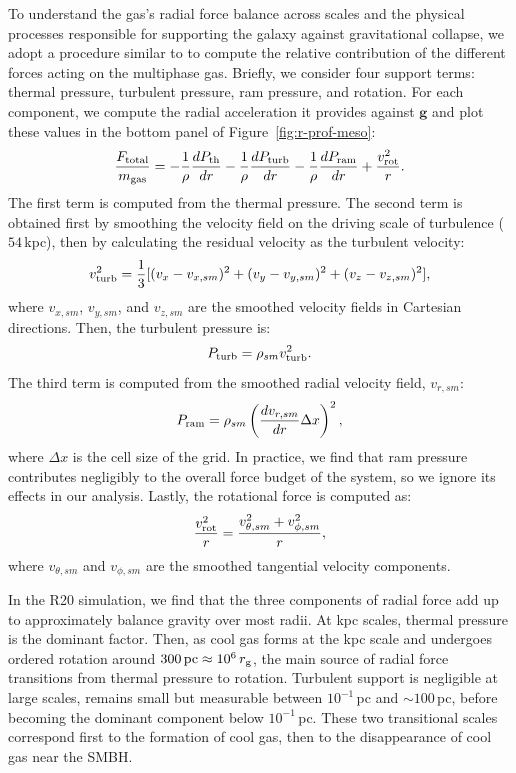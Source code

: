 To understand the gas's radial force balance across scales and the physical processes responsible for supporting the galaxy against gravitational collapse, we adopt a procedure similar to \citet{lochhaas_figuring_2022} to compute the relative contribution of the different forces acting on the multiphase gas.
Briefly, we consider four support terms: thermal pressure, turbulent pressure, ram pressure, and rotation.
For each component, we compute the radial acceleration it provides against $\mathbf{g}$ and plot these values in the bottom panel of Figure~\ref{fig:r-prof-meso}:
\begin{equation}
\frac{F_{\rm total}}{m_{\rm gas}}
=
-\frac{1}{\rho}\frac{dP_{\rm th}}{dr}
-\frac{1}{\rho}\frac{dP_{\rm turb}}{dr}
-\frac{1}{\rho}\frac{dP_{\rm ram}}{dr}
+\frac{v_{\rm rot}^{2}}{r}.
\end{equation}
The first term is computed from the thermal pressure.
The second term is obtained first by smoothing the velocity field on the driving scale of turbulence ($54$\,kpc), then by calculating the residual velocity as the turbulent velocity:
\begin{equation}
    v_{\rm turb}^2 = \frac{1}{3}
[(v_x - v_{x,sm})^2
+
(v_y - v_{y,sm})^2
+
(v_z - v_{z,sm})^2],
\end{equation}
where $v_{x,sm}$, $v_{y,sm}$, and $v_{z,sm}$ are the smoothed velocity fields in Cartesian directions.
Then, the turbulent pressure is:
\begin{equation}
    P_{\rm turb} = \rho_{sm} v_{\rm turb}^2.
\end{equation}
The third term is computed from the smoothed radial velocity field, $v_{r,sm}$:
\begin{equation}
    P_{\rm ram} = \rho_{sm} \left(\frac{dv_{r,sm}}{dr}\Delta x\right)^2,
\end{equation}
where $\Delta x$ is the cell size of the grid.
In practice, we find that ram pressure contributes negligibly to the overall force budget of the system, so we ignore its effects in our analysis.
Lastly, the rotational force is computed as:
\begin{equation}
    \frac{v_{\rm rot}^2}{r} = \frac{v_{\theta,sm}^2 + v_{\phi,sm}^2}{r},
\end{equation}
where $v_{\theta,sm}$ and $v_{\phi,sm}$ are the smoothed tangential velocity components.



In the R20 simulation, we find that the three components of radial force add up to approximately balance gravity over most radii. At kpc scales, thermal pressure is the dominant factor.
Then, as cool gas forms at the kpc scale and undergoes ordered rotation around $300\,\mathrm{pc}\approx 10^6\,r_{\rm g}$, the main source of radial force transitions from thermal pressure to rotation.
Turbulent support is negligible at large scales, remains small but measurable between $10^{-1}$\,pc and $\sim 100$\,pc, before becoming the dominant component below $10^{-1}$\,pc.
These two transitional scales correspond first to the formation of cool gas, then to the disappearance of cool gas near the SMBH.


